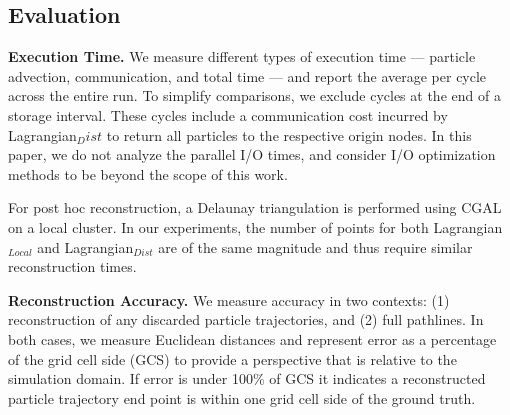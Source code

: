 \subsection{Evaluation}
\label{sec:metrics}
%
\textbf{Execution Time.} We measure different types of execution time --- particle advection, communication, and total time --- and report the average per cycle across the entire run.
%
To simplify comparisons, we exclude cycles at the end of a storage interval. 
%
These cycles include a communication cost incurred by Lagrangian$_Dist$ to return all particles to the respective origin nodes. 
%
In this paper, we do not analyze the parallel I/O times, and consider I/O optimization methods to be beyond the scope of this work.

For post hoc reconstruction, a Delaunay triangulation is performed using CGAL~\cite{2020cgal} on a local cluster.
%
In our experiments, the number of points for both Lagrangian$_{Local}$ and Lagrangian$_{Dist}$ are of the same magnitude and thus require similar reconstruction times.
%
%
%
%
%
%

\textbf{Reconstruction Accuracy.} We measure accuracy in two contexts: (1) reconstruction of any discarded particle trajectories, and (2) full pathlines.  
%
In both cases, we measure Euclidean distances and represent error as a percentage of the grid cell side (GCS) to provide a perspective that is relative to the simulation domain.
%
If error is under 100\% of GCS it indicates a reconstructed particle trajectory end point is within one grid cell side of the ground truth.

